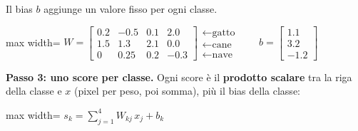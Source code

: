 \documentclass[11pt,a4paper,oneside,openany]{book}
\begin{document}
Il bias \(b\) aggiunge un valore fisso per ogni classe.

\begin{center}
\begin{adjustbox}{max width=\linewidth}
$\displaystyle 
W = \begin{bmatrix} 0.2 & -0.5 & 0.1 & 2.0 \\ 1.5 & 1.3 & 2.1 & 0.0 \\ 0 & 0.25 & 0.2 & -0.3 \end{bmatrix}\begin{matrix}\leftarrow \text{gatto}\\ \leftarrow \text{cane}\\ \leftarrow \text{nave}\end{matrix}
\qquad
b = \begin{bmatrix}1.1\\3.2\\-1.2\end{bmatrix}
$
\end{adjustbox}
\end{center}

\textbf{Passo 3: uno score per classe.} Ogni score è il \textbf{prodotto scalare} tra la riga della classe e \(x\) (pixel per peso, poi somma), più il bias della classe:

\begin{center}
\begin{adjustbox}{max width=\linewidth}
$\displaystyle 
s_k = \sum_{j=1}^{4} W_{kj}\,x_j + b_k
$
\end{adjustbox}
\end{center}
\end{document}
